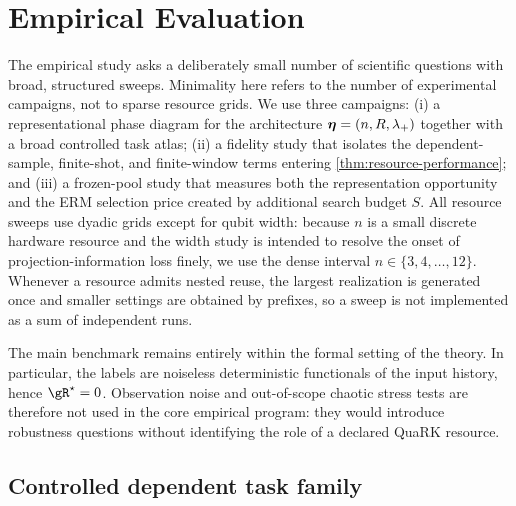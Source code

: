 \section{Empirical Evaluation}
\label{sec:experiments}
The empirical study asks a deliberately small number of scientific questions
with broad, structured sweeps.  Minimality here refers to the number of
experimental campaigns, not to sparse resource grids.  We use three campaigns:
(i) a representational phase diagram for the architecture
$\bm{\eta}=(n,R,\lambda_+)$ together with a broad controlled task atlas;
(ii) a fidelity study that isolates the dependent-sample, finite-shot, and
finite-window terms entering \cref{thm:resource-performance}; and
(iii) a frozen-pool study that measures both the representation opportunity and
the ERM selection price created by additional search budget $S$.  All resource sweeps use dyadic grids except for qubit width: because $n$ is a small discrete hardware resource and the width study is intended to resolve the onset of projection-information loss finely, we use the dense interval $n\in\{3,4,\ldots,12\}$.  Whenever a resource admits nested
reuse, the largest realization is generated once and smaller settings are
obtained by prefixes, so a sweep is not implemented as a sum of independent
runs.

The main benchmark remains entirely within the formal setting of the theory.
In particular, the labels are noiseless deterministic functionals of the input
history, hence $\risk^\star=0$.  Observation noise and out-of-scope chaotic stress tests are therefore not used in the core empirical program: they would
introduce robustness questions without identifying the role of a declared
QuaRK resource.

\subsection{Controlled dependent task family}
\label{sec:experiments-dependent-family}

